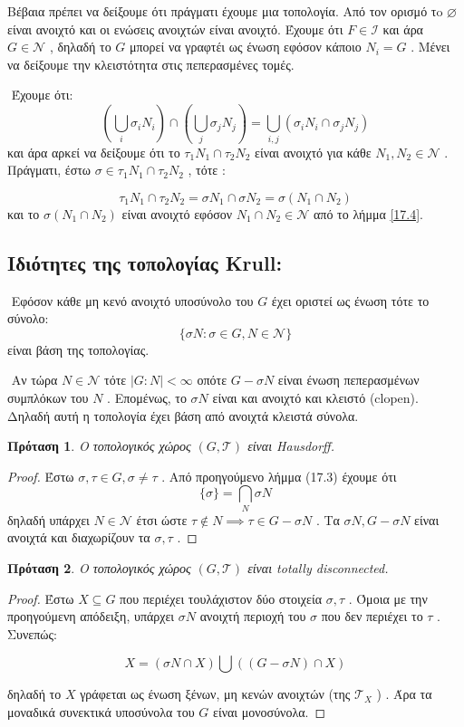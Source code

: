 \documentclass[oneside,a4paper]{article}
\newtheorem{prop}{Πρόταση}
\newcommand {\tl}{\textlatin}
\begin{document}
\noindent Βέβαια πρέπει να δείξουμε ότι πράγματι έχουμε μια τοπολογία. Από τον ορισμό τo $\varnothing$ είναι ανοιχτό και οι ενώσεις ανοιχτών είναι ανοιχτό. Έχουμε ότι $F \in \mathcal{I}$ και άρα $G \in \mathcal{N}$ , δηλαδή το $G$ μπορεί να γραφτέι ως ένωση εφόσον κάποιο $N_i = G$ . Μένει να δείξουμε την κλειστότητα στις πεπερασμένες τομές.

$ $\newline
Έχουμε ότι: 
$$\left(\bigcup_i \sigma_i N_i \right) \cap \left(\bigcup_j \sigma_j N_j \right) = \bigcup_{i, j} \left( \sigma_i N_i \cap \sigma_j N_j \right)$$
και άρα αρκεί να δείξουμε ότι το $\tau_1 N_1 \cap \tau_2 N_2$ είναι ανοιχτό για κάθε $N_1, N_2 \in \mathcal{N}$ . Πράγματι, έστω $\sigma \in \tau_1 N_1 \cap \tau_2 N_2$ , τότε :

$$\tau_1 N_1 \cap \tau_2 N_2 = \sigma N_1 \cap \sigma N_2 = \sigma (N_1 \cap N_2)$$
και το $\sigma (N_1 \cap N_2)$ είναι ανοιχτό εφόσον $N_1 \cap N_2 \in \mathcal{N}$ από το λήμμα \ref{17.4}.

\subsection{Ιδιότητες της τοπολογίας \tl{Krull}:}

$ $\newline
\noindent Εφόσον κάθε μη κενό ανοιχτό υποσύνολο του $G$ έχει οριστεί ως ένωση τότε το σύνολο:
$$\{\sigma N : \sigma \in G , N \in \mathcal{N} \}$$
είναι βάση της τοπολογίας.

$ $\newline
\noindent Αν τώρα $N \in \mathcal{N}$ τότε $|G:N|<\infty$ οπότε $G-\sigma N$ είναι ένωση πεπερασμένων συμπλόκων του $N$ . Επομένως, το $\sigma N$ είναι και ανοιχτό και κλειστό (clopen).
Δηλαδή αυτή η τοπολογία έχει βάση από ανοιχτά κλειστά σύνολα.


\begin{prop} Ο τοπολογικός χώρος $(G,\mathcal{T})$ είναι \tl{Hausdorff}.
\end{prop}
\begin{proof}


Έστω $\sigma , \tau \in G, \sigma \neq \tau$ .  Από προηγούμενο λήμμα (17.3) έχουμε ότι 
$$\{\sigma \} = \bigcap_N \sigma N$$
δηλαδή υπάρχει $N \in \mathcal{N}$ έτσι ώστε $\tau \notin N \implies \tau \in G-\sigma N$ . Τα $\sigma N , G-\sigma N$ είναι ανοιχτά και διαχωρίζουν τα $\sigma , \tau$ .
\end{proof} 
\begin{prop} Ο τοπολογικός χώρος $(G, \mathcal{T})$ είναι totally disconnected.
\end{prop}
\begin{proof} Έστω $X\subseteq G$ που περιέχει τουλάχιστον δύο στοιχεία $\sigma ,\tau$ . Όμοια με την προηγούμενη απόδειξη, υπάρχει $\sigma N$ ανοιχτή περιοχή του $\sigma$ που δεν περιέχει το $\tau$ . Συνεπώς:

$$X = \left( \sigma N \cap X \right) \bigcup \left( \left( G-\sigma N\right) \cap X\right)$$

\noindent δηλαδή το $X$ γράφεται ως ένωση ξένων, μη κενών ανοιχτών (της $\mathcal{T}_X$ ) . Άρα τα μοναδικά συνεκτικά υποσύνολα του $G$ είναι μονοσύνολα.
\end{proof}
\end{document}
